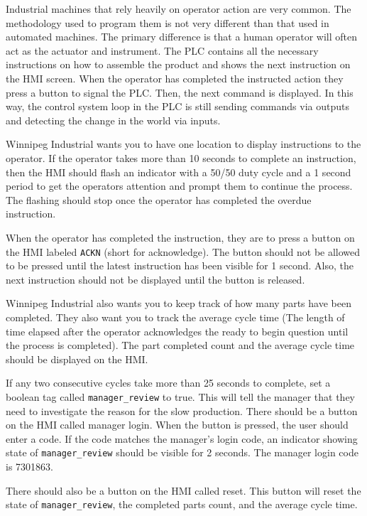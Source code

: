 Industrial machines that rely heavily on operator action are very common. The methodology used to program them is not very different than that used in automated machines. The primary difference is that a human operator will often act as the actuator and instrument. The PLC contains all the necessary instructions on how to assemble the product and shows the next instruction on the HMI screen. When the operator has completed the instructed action they press a button to signal the PLC. Then, the next command is displayed. In this way, the control system loop in the PLC is still sending commands via outputs and detecting the change in the world via inputs.

Winnipeg Industrial wants you to have one location to display instructions to the operator. If the operator takes more than 10 seconds to complete an instruction, then the HMI should flash an indicator with a 50/50 duty cycle and a 1 second period to get the operators attention and prompt them to continue the process. The flashing should stop once the operator has completed the overdue instruction.

When the operator has completed the instruction, they are to press a button on the HMI labeled \verb|ACKN| (short for acknowledge). The button should not be allowed to be pressed until the latest instruction has been visible for 1 second. Also, the next instruction should not be displayed until the button is released.

Winnipeg Industrial also wants you to keep track of how many parts have been completed. They also want you to track the average cycle time (The length of time elapsed after the operator acknowledges the ready to begin question until the process is completed). The part completed count and the average cycle time should be displayed on the HMI.

If any two consecutive cycles take more than 25 seconds to complete, set a boolean tag called \verb|manager_review| to true. This will tell the manager that they need to investigate the reason for the slow production. There should be a button on the HMI called manager login. When the button is pressed, the user should enter a code. If the code matches the manager's login code, an indicator showing state of \verb|manager_review| should be visible for 2 seconds. The manager login code is 7301863.

There should also be a button on the HMI called reset. This button will reset the state of \verb|manager_review|, the completed parts count, and the average cycle time.

